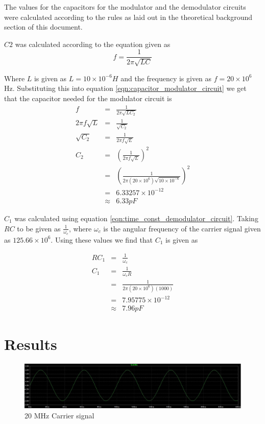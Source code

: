 \documentclass[12pt, a4paper]{article}
\begin{document}
	The values for the capacitors for the modulator and the demodulator circuits were calculated according to the rules as laid out in the theoretical background section of this document.

	$C2$ was calculated according to the equation given as 
	\begin{equation}
		f =  \frac{1}{2\pi\sqrt{LC}} 
		\label{eqn:capacitor_modulator_circuit}
	\end{equation}

	Where $L$ is given as $L = 10\times10^{-6}H$ and the frequency is given as $f= 20\times 10^6 $Hz. Substituting this into equation \ref{eqn:capacitor_modulator_circuit} we get that the capacitor needed for the modulator circuit is
	\[
		\begin{array}{rcl}
			f & = & \frac{1}{2\pi\sqrt{LC_2}} \\
			2\pi f \sqrt{L} & = & \frac{1}{\sqrt{C_2}} \\
			\sqrt{C_2} & = & \frac{1}{2\pi f \sqrt{L}} \\
			C_2 & = & \left(\frac{1}{2\pi f \sqrt{L}}\right)^2 \\
			& = & \left(\frac{1}{2\pi(20\times 10^6)\sqrt{10\times 10^{-6}}}\right)^2 \\
			& = & 6.33257 \times 10^{-12} \\
			& \approx & 6.33 pF 
		\end{array}
	\]

	$C_1$ was calculated using equation \ref{eqn:time_const_demodulator_circuit}. Taking $RC$ to be given as $\frac{1}{\omega_c}$, where $\omega_c$ is the angular frequency of the carrier signal given as $125.66 \times 10^6 $. Using these values we find that $C_1$ is given as

	\[
		\begin{array}{rcl}
			RC_1 & = & \frac{1}{\omega_c} \\
			C_1 & = & \frac{1}{\omega_c R} \\
			& = & \frac{1}{2\pi (20\times 10^6)(1000)} \\
			& = & 7.95775 \times 10^{-12} \\
			& \approx & 7.96 pF
		\end{array}
	\]



\section{Results} %
\label{sec:results}
	\begin{figure}[H]
		\centering
		\includegraphics[width=\textwidth]{images/carrier.JPG}
		\caption{20 MHz Carrier signal}
		\label{fig:carrier}
	\end{figure}
\end{document}
